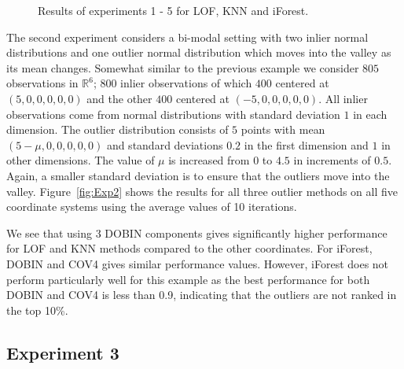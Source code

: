 \documentclass[letter,12pt]{article}
\begin{document}
\begin{figure}[!p]
{         \label{fig:Exp4}
	} 
	\caption{Results of experiments 1 - 5 for LOF, KNN and iForest.  }
\end{figure}

The second experiment considers a bi-modal setting with two inlier normal distributions and one outlier normal distribution which moves into the valley as its mean changes. Somewhat similar to the previous example we consider $805$ observations in $\mathbb{R}^6$; $800$ inlier observations of which $400$ centered at $(5,0,0,0,0,0)$ and the other $400$ centered at $(-5,0,0,0,0,0)$. All inlier observations come from normal distributions with standard deviation $1$ in each dimension. The outlier distribution consists of $5$ points with mean $(5-\mu,0,0,0,0,0)$ and standard deviations $0.2$ in the first dimension and $1$ in other dimensions. The value of $\mu$ is increased from $0$ to $4.5$ in increments of $0.5$. Again, a smaller standard deviation is to ensure that the outliers move into the valley. Figure~\ref{fig:Exp2} shows the results for all three outlier methods on all { \color{blue}five } coordinate systems using the average values of 10 iterations.

{\color{blue} We see that using 3 DOBIN components gives significantly higher performance for LOF and KNN methods compared to the other coordinates. For iForest, DOBIN and COV4 gives similar performance values. However, iForest does not perform particularly well for this example as the best performance for both DOBIN and COV4 is less than 0.9, indicating that the outliers are not ranked in the top 10\%. }


\subsection{Experiment 3}
\end{document}
